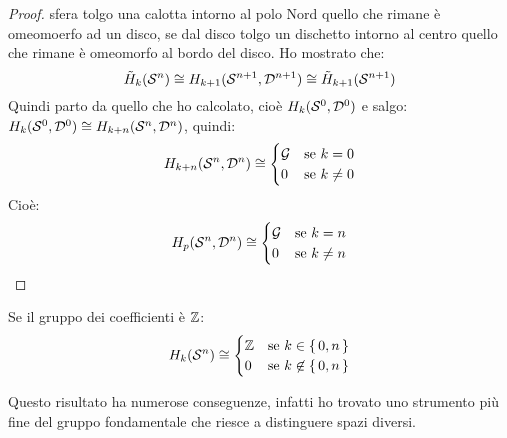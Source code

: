 \begin{proof}
  sfera tolgo una calotta intorno al polo Nord quello che rimane è omeomoerfo
  ad un disco, se dal disco tolgo un dischetto intorno al centro quello
  che rimane è omeomorfo al bordo del disco.
  Ho mostrato che:
  \[
    \tilde{H}_k(\mathcal{S}^{n}) \cong H_{k+1}(\mathcal{S}^{n+1}, \mathcal{D}^{n+1}) \cong \tilde{H}_{k+1}(\mathcal{S}^{n+1})
  \]
  Quindi parto da quello che ho calcolato, cioè $ H_k(\mathcal{S}^{0}, \mathcal{D}^{0}) $ e salgo:
  $ H_k(\mathcal{S}^{0}, \mathcal{D}^{0}) \cong H_{k+n}(\mathcal{S}^{n}, \mathcal{D}^{n}) $, quindi:
  \[
    H_{k+n}(\mathcal{S}^{n}, \mathcal{D}^{n}) \cong
    \begin{cases}
      \mathcal{G} & \text{se } k = 0 \\
      0 & \text{se } k \not = 0
    \end{cases}
  \]
  Cioè:
  \[
    H_{p}(\mathcal{S}^{n}, \mathcal{D}^{n}) \cong
    \begin{cases}
      \mathcal{G} & \text{se } k = n \\
      0 & \text{se } k \not = n
    \end{cases}
  \]

\end{proof}


\begin{corollary}
  Se il gruppo dei coefficienti è $ \mathbb{Z} $:
  \[
    H_k(\mathcal{S}^{n}) \cong
    \begin{cases}
      \mathbb{Z} & \text{se } k \in \set{0, n} \\
      0 & \text{se } k \not \in \set{0, n}
    \end{cases}
  \]
\end{corollary}
Questo risultato ha numerose conseguenze, infatti ho trovato uno
strumento più fine del gruppo fondamentale che riesce a distinguere
spazi diversi.

